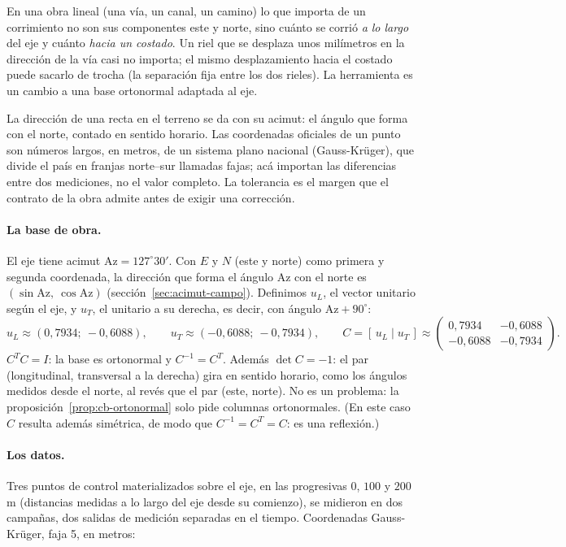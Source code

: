 En una obra lineal (una vía, un canal, un camino) lo que importa de un corrimiento no son sus
componentes este y norte, sino cuánto se corrió \emph{a lo largo} del eje y cuánto \emph{hacia
un costado}. Un riel que se desplaza unos milímetros en la dirección de la vía casi no importa;
el mismo desplazamiento hacia el costado puede sacarlo de trocha (la separación fija entre los
dos rieles). La herramienta es un cambio a una base ortonormal adaptada al eje.

\begin{idea}
La dirección de una recta en el terreno se da con su acimut: el ángulo que forma con el norte,
contado en sentido horario. Las coordenadas oficiales de un punto son números largos, en metros,
de un sistema plano nacional (Gauss-Krüger), que divide el país en franjas norte--sur llamadas
fajas; acá importan las diferencias entre dos mediciones, no el valor completo. La tolerancia es
el margen que el contrato de la obra admite antes de exigir una corrección.
\end{idea}

\paragraph{La base de obra.} El eje tiene acimut \(\mathrm{Az}=127^\circ30'\). Con \(E\) y \(N\)
(este y norte) como primera y segunda coordenada, la dirección que forma el ángulo \(\mathrm{Az}\)
con el norte es
\((\sin\mathrm{Az},\ \cos\mathrm{Az})\) (sección~\ref{sec:acimut-campo}). Definimos
\(u_L\), el vector unitario según el eje, y \(u_T\), el unitario a su derecha, es decir, con
ángulo \(\mathrm{Az}+90^\circ\):
\[
  u_L\approx(0{,}7934;\ -0{,}6088),\qquad u_T\approx(-0{,}6088;\ -0{,}7934),\qquad
  C=[\,u_L\mid u_T\,]\approx\begin{pmatrix}0{,}7934&-0{,}6088\\-0{,}6088&-0{,}7934\end{pmatrix}.
\]
\(C^TC=I\): la base es ortonormal y \(C^{-1}=C^T\). Además \(\det C=-1\): el par
(longitudinal, transversal a la derecha) gira en sentido horario, como los ángulos medidos desde el norte, al revés
que el par (este, norte). No es un problema: la proposición~\ref{prop:cb-ortonormal} solo pide
columnas ortonormales. (En este caso \(C\) resulta además simétrica, de modo que
\(C^{-1}=C^T=C\): es una reflexión.)

\paragraph{Los datos.} Tres puntos de control materializados sobre el eje, en las progresivas
\(0\), \(100\) y \(200\) m (distancias medidas a lo largo del eje desde su comienzo), se
midieron en dos campañas, dos salidas de medición separadas en el tiempo. Coordenadas Gauss-Krüger, faja 5, en
metros:

